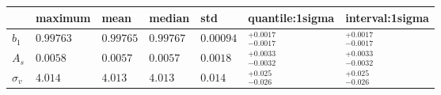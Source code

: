 \begin{tabular}{lllllll}
\hline
              & maximum   & mean      & median    & std       & quantile:1sigma          & interval:1sigma          \\
\hline
 $b_{1}$      & $0.99763$ & $0.99765$ & $0.99767$ & $0.00094$ & ${}_{-0.0017}^{+0.0017}$ & ${}_{-0.0017}^{+0.0017}$ \\
 $A_{s}$      & $0.0058$  & $0.0057$  & $0.0057$  & $0.0018$  & ${}_{-0.0032}^{+0.0033}$ & ${}_{-0.0032}^{+0.0033}$ \\
 $\sigma_{v}$ & $4.014$   & $4.013$   & $4.013$   & $0.014$   & ${}_{-0.026}^{+0.025}$   & ${}_{-0.026}^{+0.025}$   \\
\hline
\end{tabular}